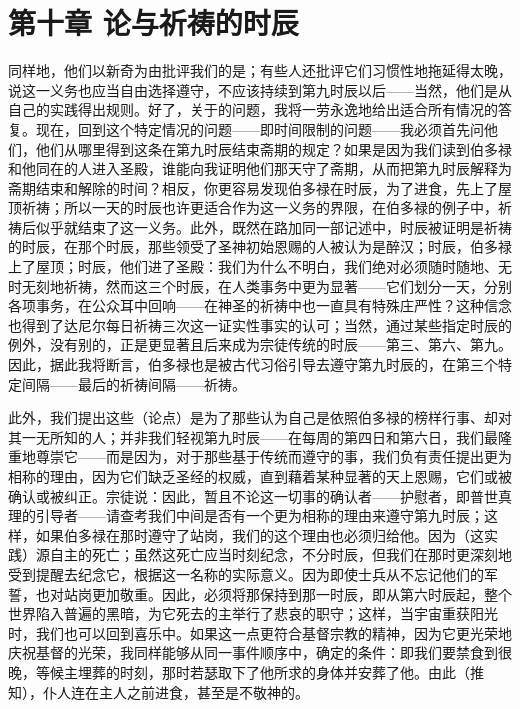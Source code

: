 
\section{第十章 论与祈祷的时辰}

同样地，他们以新奇为由批评我们的是；有些人还批评它们习惯性地拖延得太晚，说这一义务也应当自由选择遵守，不应该持续到第九时辰以后——当然，他们是从自己的实践得出规则。好了，关于的问题，我将一劳永逸地给出适合所有情况的答复。现在，回到这个特定情况的问题——即时间限制的问题——我必须首先问他们，他们从哪里得到这条在第九时辰结束斋期的规定？如果是因为我们读到伯多禄和他同在的人进入圣殿，谁能向我证明他们那天守了斋期，从而把第九时辰解释为斋期结束和解除的时间？相反，你更容易发现伯多禄在时辰，为了进食，先上了屋顶祈祷；所以一天的时辰也许更适合作为这一义务的界限，在伯多禄的例子中，祈祷后似乎就结束了这一义务。此外，既然在路加同一部记述中，时辰被证明是祈祷的时辰，在那个时辰，那些领受了圣神初始恩赐的人被认为是醉汉；时辰，伯多禄上了屋顶；时辰，他们进了圣殿：我们为什么不明白，我们绝对必须随时随地、无时无刻地祈祷，然而这三个时辰，在人类事务中更为显著——它们划分一天，分别各项事务，在公众耳中回响——在神圣的祈祷中也一直具有特殊庄严性？这种信念也得到了达尼尔每日祈祷三次这一证实性事实的认可；当然，通过某些指定时辰的例外，没有别的，正是更显著且后来成为宗徒传统的时辰——第三、第六、第九。因此，据此我将断言，伯多禄也是被古代习俗引导去遵守第九时辰的，在第三个特定间隔——最后的祈祷间隔——祈祷。\par

此外，我们提出这些（论点）是为了那些认为自己是依照伯多禄的榜样行事、却对其一无所知的人；并非我们轻视第九时辰——在每周的第四日和第六日，我们最隆重地尊崇它——而是因为，对于那些基于传统而遵守的事，我们负有责任提出更为相称的理由，因为它们缺乏圣经的权威，直到藉着某种显著的天上恩赐，它们或被确认或被纠正。宗徒说：因此，暂且不论这一切事的确认者——护慰者，即普世真理的引导者——请查考我们中间是否有一个更为相称的理由来遵守第九时辰；这样，如果伯多禄在那时遵守了站岗，我们的这个理由也必须归给他。因为（这实践）源自主的死亡；虽然这死亡应当时刻纪念，不分时辰，但我们在那时更深刻地受到提醒去纪念它，根据这一名称的实际意义。因为即使士兵从不忘记他们的军誓，也对站岗更加敬重。因此，必须将那保持到那一时辰，即从第六时辰起，整个世界陷入普遍的黑暗，为它死去的主举行了悲哀的职守；这样，当宇宙重获阳光时，我们也可以回到喜乐中。如果这一点更符合基督宗教的精神，因为它更光荣地庆祝基督的光荣，我同样能够从同一事件顺序中，确定的条件：即我们要禁食到很晚，等候主埋葬的时刻，那时若瑟取下了他所求的身体并安葬了他。由此（推知），仆人连在主人之前进食，甚至是不敬神的。\par

